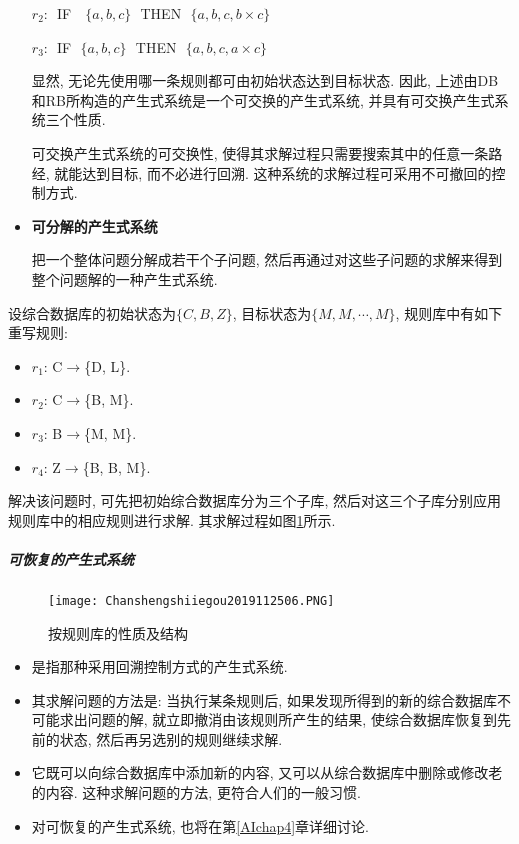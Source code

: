 \begin{itemize}
    \quad$r_2$:\,\,      IF \,\,     $\{a,b,c\}$\,\,      THEN\,\,       $\{a, b, c, b\times c\}$

     \quad$r_3$:\,\,      IF\,\,     $\{a,b,c\}$\,\,     THEN\,\,       $\{a, b, c, a\times c\}$

      显然, 无论先使用哪一条规则都可由初始状态达到目标状态. 因此, 上述由DB和RB所构造的产生式系统是一个可交换的产生式系统, 并具有可交换产生式系统三个性质.

\quad 可交换产生式系统的可交换性, 使得其求解过程只需要搜索其中的任意一条路经, 就能达到目标, 而不必进行回溯.
      这种系统的求解过程可采用不可撤回的控制方式.

\item \textbf{可分解的产生式系统}

     把一个整体问题分解成若干个子问题, 然后再通过对这些子问题的求解来得到整个问题解的一种产生式系统.
\end{itemize}
\begin{example}
设综合数据库的初始状态为$\{C, B, Z\}$, 目标状态为$\{M, M,\cdots, M\}$, 规则库中有如下重写规则:
\begin{itemize}
\item $r_1$: C$\rightarrow$\{D, L\}.
\item $r_2$: C$\rightarrow$\{B, M\}.
\item $r_3$: B$\rightarrow$\{M, M\}.
\item $r_4$: Z$\rightarrow$\{B, B, M\}.
\end{itemize}
\end{example}
解决该问题时, 可先把初始综合数据库分为三个子库, 然后对这三个子库分别应用规则库中的相应规则进行求解. 其求解过程如图\ref{AI32fig07}所示.
\subparagraph{可恢复的产生式系统}
\begin{figure}[H]
\vspace{-0.5cm}
\centering
\texttt{[image: Chanshengshiiegou2019112506.PNG]}
\caption{按规则库的性质及结构}
\label{AI32fig07}
\end{figure}
\begin{itemize}
\item 是指那种采用回溯控制方式的产生式系统.
\item 其求解问题的方法是: 当执行某条规则后, 如果发现所得到的新的综合数据库不可能求出问题的解, 就立即撤消由该规则所产生的结果, 使综合数据库恢复到先前的状态, 然后再另选别的规则继续求解.
\item 它既可以向综合数据库中添加新的内容, 又可以从综合数据库中删除或修改老的内容. 这种求解问题的方法, 更符合人们的一般习惯.
\item 对可恢复的产生式系统, 也将在第\ref{AIchap4}章详细讨论.
\end{itemize}
